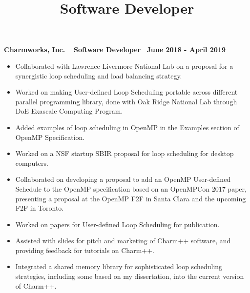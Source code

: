 \title{Software Developer}
\textbf{Charmworks, Inc. $\>$$\>$$\>$$\>$Software Developer$\>$$\>$$\>$$\>$June 2018 - April 2019}
\vspace{0.0in}
\begin{itemize}
\item Collaborated with Lawrence Livermore National Lab on a proposal for a synergistic loop scheduling and load balancing strategy. 
\item Worked on making User-defined Loop Scheduling portable across different parallel programming library, done with Oak Ridge National Lab through DoE Exascale Computing Program. 
\item Added examples of loop scheduling in OpenMP in the Examples section of OpenMP Specification.
\item Worked on a NSF startup SBIR proposal for loop scheduling for desktop computers. 
\item Collaborated on developing a proposal to add an OpenMP User-defined Schedule to the OpenMP specification based on an OpenMPCon 2017 paper, presenting a proposal at the OpenMP F2F in Santa Clara and the upcoming F2F in Toronto.
\item Worked on papers for User-defined Loop Scheduling for publication.
\item Assisted with slides for pitch and marketing of Charm++ software, and providing feedback for tutorials on Charm++.
\item Integrated a shared memory library for sophisticated loop scheduling strategies, including some based on my dissertation, into the current version of Charm++.
\end{itemize}

